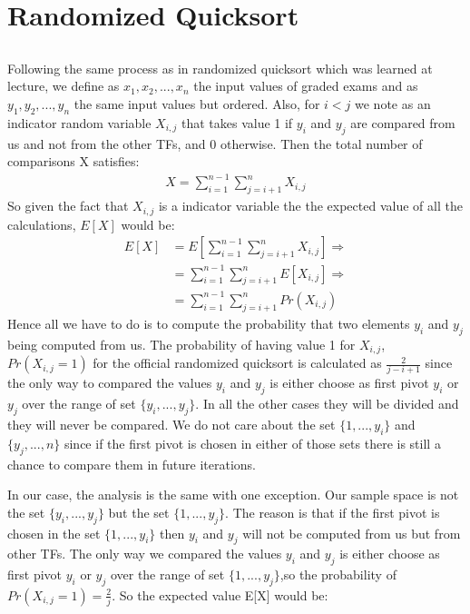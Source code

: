 \documentclass[11pt]{537homework}
\begin{document}
\section{Randomized Quicksort}

\subsection{}
Following the same process as in randomized quicksort which was learned at lecture, we define as $x_1,x_2,...,x_n$ the input values of graded exams and as $y_1,y_2,...,y_n$ the same input values but ordered. Also, for $i<j$ we note as an indicator random variable $X_{i,j}$ that takes value 1 if $y_i$ and $y_j$ are compared from us and not from the other TFs, and 0 otherwise. Then the total number of comparisons X satisfies:
\begingroup
\allowdisplaybreaks
\begin{align*}
 X = \sum_{i=1}^{n-1} \sum_{j=i+1}^{n} X_{i,j}
\end{align*}
\endgroup
So given the fact that $X_{i,j}$ is a indicator variable the the expected value of all the calculations, $E[X]$ would be:
\begingroup
\allowdisplaybreaks
\begin{align*}
 E[X] &= E[\sum_{i=1}^{n-1} \sum_{j=i+1}^{n} X_{i,j}] \Longrightarrow \\
      &= \sum_{i=1}^{n-1} \sum_{j=i+1}^{n} E[X_{i,j}] \Longrightarrow \\
      &= \sum_{i=1}^{n-1} \sum_{j=i+1}^{n} Pr(X_{i,j}) 
\end{align*}
\endgroup
Hence all we have to do is to compute the probability that two elements $y_i$ and $y_j$ being computed from us. The probability of having value 1 for $X_{i,j}$, $Pr(X_{i,j} = 1)$ for the official randomized quicksort is calculated as  $\frac{2}{j-i+1}$ since the only way to compared the values $y_i$ and $y_j$ is either choose as first pivot $y_i$ or $y_j$ over the range of set $\{ y_i,...,y_j \}$. In all the other cases they will be divided and they will never be compared. We do not care about the set $\{ 1,...,y_i \}$ and $\{ y_j,...,n \}$ since if the first pivot is chosen in either of those sets there is still a chance to compare them in future iterations.
\par In our case, the analysis is the same with one exception. Our sample space is not the set $\{ y_i,...,y_j \}$ but the set $\{ 1,...,y_j \}$. The reason is that if the first pivot is chosen in the set $\{ 1,...,y_i \}$ then $y_i$ and $y_j$ will not be computed from us but from other TFs. The only way we compared the values $y_i$ and $y_j$ is either choose as first pivot $y_i$ or $y_j$ over the range of set $\{ 1,...,y_j \}$,so the probability of $Pr(X_{i,j} = 1) = \frac{2}{j}$. So the expected value E[X] would be: 
\end{document}
